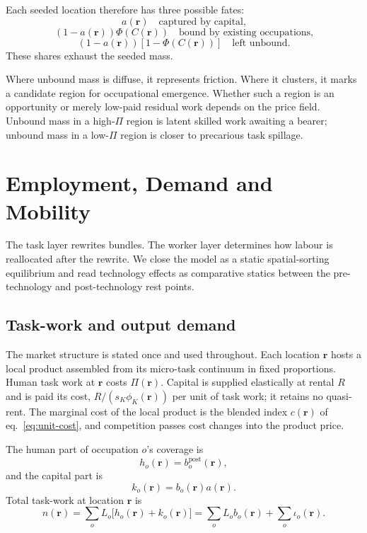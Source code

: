 \documentclass[12pt, a4paper]{article}
\begin{document}
Each seeded location therefore has three possible fates:
\[
  a(\mathbf{r}) \quad \text{captured by capital,}
\]
\[
  (1-a(\mathbf{r}))\Phi(C(\mathbf{r}))
  \quad \text{bound by existing occupations,}
\]
\[
  (1-a(\mathbf{r}))[1-\Phi(C(\mathbf{r}))]
  \quad \text{left unbound.}
\]
These shares exhaust the seeded mass.

Where unbound mass is diffuse, it represents friction. Where it
clusters, it marks a candidate region for occupational emergence.
Whether such a region is an opportunity or merely low-paid residual work
depends on the price field. Unbound mass in a high-$\Pi$ region is
latent skilled work awaiting a bearer; unbound mass in a low-$\Pi$
region is closer to precarious task spillage.

\section{Employment, Demand and Mobility}
\label{sec:employment-demand}

The task layer rewrites bundles. The worker layer determines how labour
is reallocated after the rewrite. We close the model as a static
spatial-sorting equilibrium and read technology effects as comparative
statics between the pre-technology and post-technology rest points.

\subsection{Task-work and output demand}
\label{sec:demand}

The market structure is stated once and used throughout. Each location
$\mathbf{r}$ hosts a local product assembled from its micro-task
continuum in fixed proportions. Human task work at $\mathbf{r}$ costs
$\Pi(\mathbf{r})$. Capital is supplied elastically at rental $R$ and is
paid its cost, $R/(s_K\phi_K(\mathbf{r}))$ per unit of task work; it
retains no quasi-rent. The marginal cost of the local product is the
blended index $c(\mathbf{r})$ of eq.~\eqref{eq:unit-cost}, and
competition passes cost changes into the product price.

The human part of occupation $o$'s coverage is
\[
  h_o(\mathbf{r}) = b_o^{\text{post}}(\mathbf{r}),
\]
and the capital part is
\[
  k_o(\mathbf{r}) = b_o(\mathbf{r})a(\mathbf{r}).
\]
Total task-work at location $\mathbf{r}$ is
\begin{equation}
  n(\mathbf{r})
  =
  \sum_o L_o
  \bigl[
    h_o(\mathbf{r}) + k_o(\mathbf{r})
  \bigr]
  =
  \sum_o L_o b_o(\mathbf{r})
  +
  \sum_o \iota_o(\mathbf{r}).
  \label{eq:taskwork-density}
\end{equation}
\end{document}
